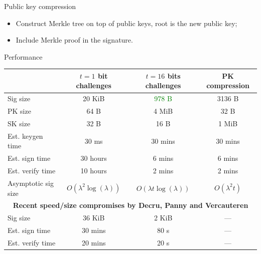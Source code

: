 \documentclass[aspectratio=169]{beamer}
\renewcommand{\emph}[1]{{\usebeamercolor[fg]{structure}#1}}
\newcommand{\gn}[1]{\textcolor{green}{#1}}
\begin{document}

\begin{frame}{Public key compression}
  \begin{center}
  \end{center}
  \medskip
  \begin{itemize}
  \item<2-> Construct Merkle tree on top of public keys, \emph{root is the new public key};
  \item<3-> Include Merkle proof in the signature.
  \end{itemize}
\end{frame}


\begin{frame}{Performance}
  \begin{tabular}{l  c  c  c }
    & \bf $t=1$ bit challenges
    & \bf $t=16$ bits challenges
    & \bf PK compression \\
    \hline
    Sig size
    & \alert{20 KiB} & \gn{978 B} & 3136 B\\
    PK size
    & 64 B & \alert{4 MiB} & 32 B\\
    SK size
    & 32 B & 16 B & \alert{1 MiB} \\
    Est. keygen time
    & 30 ms & \alert{30 mins} & \alert{30 mins} \\
    Est. sign time
    & \alert{30 hours} & 6 mins & 6 mins \\
    Est. verify time
    & \alert{10 hours} & 2 mins & 2 mins \\
    \hline
    Asymptotic sig size
    & $O(\lambda^2\log(\lambda))$ & $O(\lambda t\log(\lambda))$ & $O(\lambda^2 t)$\pause\\[2em]
    \multicolumn{4}{c}{\bf Recent speed/size compromises by Decru, Panny and Vercauteren}\\
    \hline
    {Sig size}
    & 36 KiB & 2 KiB & ---\\
    {Est. sign time}
    & 30 mins & 80 s & ---\\
    {Est. verify time}
    & 20 mins & 20 s & ---
  \end{tabular}
\end{frame}
\end{document}
